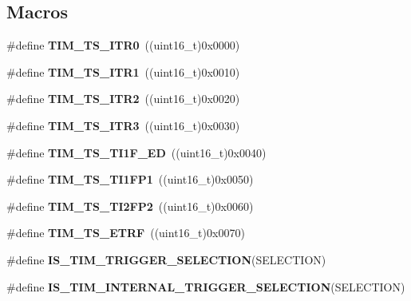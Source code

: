 \subsection*{Macros}
\begin{DoxyCompactItemize}
\item 
\mbox{\label{group___t_i_m___internal___trigger___selection_gab7cf2b7db3956d4fd1e5a5d84f4891e7}} 
\#define {\bfseries T\+I\+M\+\_\+\+T\+S\+\_\+\+I\+T\+R0}~((uint16\+\_\+t)0x0000)
\item 
\mbox{\label{group___t_i_m___internal___trigger___selection_gad90fbca297153ca9c0112a67ea2c6cb3}} 
\#define {\bfseries T\+I\+M\+\_\+\+T\+S\+\_\+\+I\+T\+R1}~((uint16\+\_\+t)0x0010)
\item 
\mbox{\label{group___t_i_m___internal___trigger___selection_ga8599ba58a5f911d648503c7ac55d4320}} 
\#define {\bfseries T\+I\+M\+\_\+\+T\+S\+\_\+\+I\+T\+R2}~((uint16\+\_\+t)0x0020)
\item 
\mbox{\label{group___t_i_m___internal___trigger___selection_ga63183e611b91c5847040172c0069514d}} 
\#define {\bfseries T\+I\+M\+\_\+\+T\+S\+\_\+\+I\+T\+R3}~((uint16\+\_\+t)0x0030)
\item 
\mbox{\label{group___t_i_m___internal___trigger___selection_ga8c89554efc693e679c94b5a749af123c}} 
\#define {\bfseries T\+I\+M\+\_\+\+T\+S\+\_\+\+T\+I1\+F\+\_\+\+ED}~((uint16\+\_\+t)0x0040)
\item 
\mbox{\label{group___t_i_m___internal___trigger___selection_ga38d3514d54bcdb0ea8ac8bd91c5832b5}} 
\#define {\bfseries T\+I\+M\+\_\+\+T\+S\+\_\+\+T\+I1\+F\+P1}~((uint16\+\_\+t)0x0050)
\item 
\mbox{\label{group___t_i_m___internal___trigger___selection_ga0ed58a269bccd3f22d19cc9a2ba3123f}} 
\#define {\bfseries T\+I\+M\+\_\+\+T\+S\+\_\+\+T\+I2\+F\+P2}~((uint16\+\_\+t)0x0060)
\item 
\mbox{\label{group___t_i_m___internal___trigger___selection_gaece08e02e056613a882aa7ff0a6ccc2d}} 
\#define {\bfseries T\+I\+M\+\_\+\+T\+S\+\_\+\+E\+T\+RF}~((uint16\+\_\+t)0x0070)
\item 
\#define {\bfseries I\+S\+\_\+\+T\+I\+M\+\_\+\+T\+R\+I\+G\+G\+E\+R\+\_\+\+S\+E\+L\+E\+C\+T\+I\+ON}(S\+E\+L\+E\+C\+T\+I\+ON)
\item 
\#define {\bfseries I\+S\+\_\+\+T\+I\+M\+\_\+\+I\+N\+T\+E\+R\+N\+A\+L\+\_\+\+T\+R\+I\+G\+G\+E\+R\+\_\+\+S\+E\+L\+E\+C\+T\+I\+ON}(S\+E\+L\+E\+C\+T\+I\+ON)
\end{DoxyCompactItemize}



